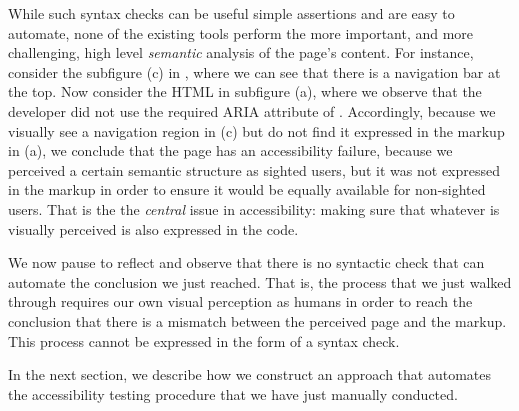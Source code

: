 While such syntax checks can be useful simple 
assertions and are easy to automate, 
none of the existing tools perform the more important, 
and more challenging, high level \emph{semantic} 
analysis of the page's content. 
For instance, consider the subfigure (c) in , 
where we can see that there is a navigation bar at the top. 
Now consider the HTML in subfigure (a), where we observe that 
the developer did not use the required ARIA attribute 
of . 
Accordingly, because we visually see a navigation region in (c) 
but do not find it expressed in the markup in (a), 
we conclude that the page has an accessibility failure, 
because we perceived a certain semantic structure as sighted users, 
but it was not expressed in the markup in order to ensure it would 
be equally available for non-sighted users. 
That is the the \emph{central} issue in accessibility: 
making sure that whatever is visually perceived 
is also expressed in the code. 

We now pause to reflect and observe that there is no syntactic check 
that can automate the conclusion we just reached. 
That is, the process that we just walked through requires 
our own visual perception as humans in order to reach the conclusion 
that there is a mismatch between the perceived page and the markup. 
This process cannot be expressed in the form of a syntax check. 

In the next section, we describe how we construct an approach that automates the accessibility testing procedure that we have just manually conducted. 